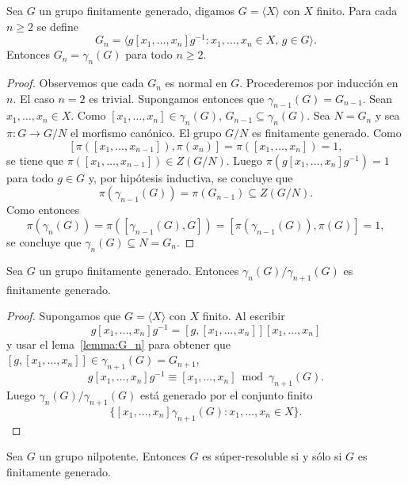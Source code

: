 \begin{lemma}
	\label{lemma:G_n}
	Sea $G$ un grupo finitamente generado, digamos $G=\langle X\rangle$ con $X$
	finito. Para cada $n\geq2$ se define
	\[
		G_n=\langle g[x_1,\dots,x_n]g^{-1}:x_1,\dots,x_n\in X,\,g\in G\rangle.
	\]
	Entonces $G_n=\gamma_n(G)$ para todo $n\geq2$. 
\end{lemma}

\begin{proof}
	Observemos que cada $G_n$ es normal en $G$.  Procederemos por inducción en
	$n$. El caso $n=2$ es trivial. Supongamos entonces que
	$\gamma_{n-1}(G)=G_{n-1}$. Sean $x_1,\dots,x_n\in X$. Como
	$[x_1,\dots,x_n]\in\gamma_{n}(G)$, $G_{n-1}\subseteq\gamma_n(G)$. Sea
	$N=G_n$ y sea $\pi\colon G\to G/N$ el morfismo canónico. El grupo $G/N$ es
	finitamente generado. Como
	\[
	[\pi([x_1,\dots,x_{n-1}]),\pi(x_n)]=\pi([x_1,\dots,x_n])=1,
	\]
	se tiene que $\pi([x_1,\dots,x_{n-1}])\in Z(G/N)$. Luego
	$\pi(g[x_1,\dots,x_n]g^{-1})=1$ para todo $g\in G$ y, por hipótesis
	inductiva, 
	se concluye que 
	\[
	\pi(\gamma_{n-1}(G))=\pi(G_{n-1})\subseteq Z(G/N).
	\]
	Como entonces 
	\[
	\pi(\gamma_{n}(G))=\pi([\gamma_{n-1}(G),G])=[\pi(\gamma_{n-1}(G)),\pi(G)]=1,
	\]
	se concluye que $\gamma_n(G)\subseteq N=G_n$.
\end{proof}

\begin{lemma}
	\label{lemma:gamma_n/gamma_n+1}
	Sea $G$ un grupo finitamente generado.  Entonces
	$\gamma_n(G)/\gamma_{n+1}(G)$ es finitamente generado. 
\end{lemma}

\begin{proof}
	Supongamos que $G=\langle X\rangle$ con $X$ finito. 
	Al escribir 
	\[
	g[x_1,\dots,x_n]g^{-1}=[g,[x_1,\dots,x_n]][x_1,\dots,x_n]
	\]
	y usar el lema~\ref{lemma:G_n} para obtener 
	que $[g,[x_1,\dots,x_n]]\in \gamma_{n+1}(G)=G_{n+1}$, 
	\[
	g[x_1,\dots,x_n]g^{-1}\equiv [x_1,\dots,x_n]\bmod \gamma_{n+1}(G). 
	\]
	Luego $\gamma_{n}(G)/\gamma_{n+1}(G)$ está generado por 
	el conjunto finito 
	\[
	\{[x_1,\dots,x_n]\gamma_{n+1}(G):x_1,\dots,x_n\in X\}. 
	\]
\end{proof}

\begin{theorem}
	\label{theorem:super=fg}
	Sea $G$ un grupo nilpotente. Entonces $G$ es súper-resoluble si y sólo si
	$G$ es finitamente generado.
\end{theorem}


